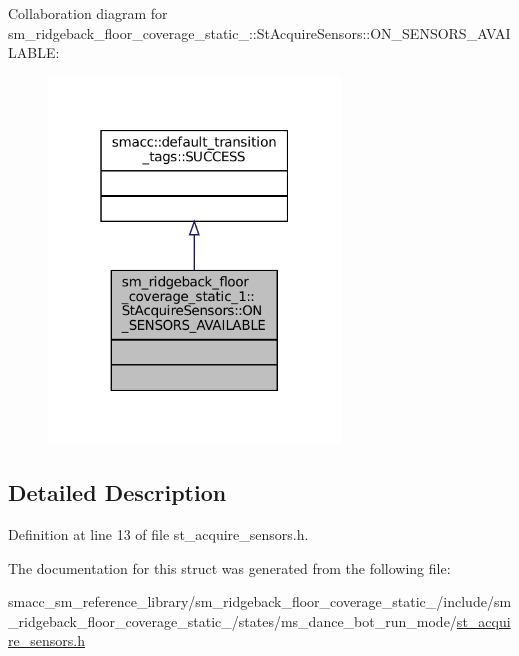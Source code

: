 Collaboration diagram for sm\+\_\+ridgeback\+\_\+floor\+\_\+coverage\+\_\+static\+\_\+:\+:St\+Acquire\+Sensors\+:\+:O\+N\+\_\+\+S\+E\+N\+S\+O\+R\+S\+\_\+\+A\+V\+A\+I\+L\+A\+B\+LE\+:
\nopagebreak
\begin{figure}[H]
\begin{center}
\leavevmode
\includegraphics[width=220pt]{structsm__ridgeback__floor__coverage__static__1_1_1StAcquireSensors_1_1ON__SENSORS__AVAILABLE__coll__graph}
\end{center}
\end{figure}


\subsection{Detailed Description}


Definition at line 13 of file st\+\_\+acquire\+\_\+sensors.\+h.



The documentation for this struct was generated from the following file\+:\begin{DoxyCompactItemize}
\item 
smacc\+\_\+sm\+\_\+reference\+\_\+library/sm\+\_\+ridgeback\+\_\+floor\+\_\+coverage\+\_\+static\+\_/include/sm\+\_\+ridgeback\+\_\+floor\+\_\+coverage\+\_\+static\+\_/states/ms\+\_\+dance\+\_\+bot\+\_\+run\+\_\+mode/\hyperlink{sm__ridgeback__floor__coverage__static__1_2include_2sm__ridgeback__floor__coverage__static__1_2s8d631c3395ca0f2dfea7f5ba27795308}{st\+\_\+acquire\+\_\+sensors.\+h}\end{DoxyCompactItemize}
